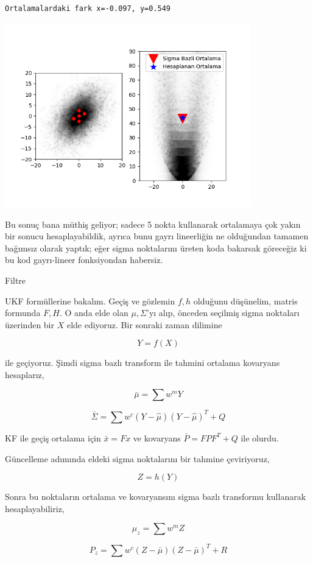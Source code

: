 \documentclass[12pt,fleqn]{article}\usepackage{../../common}
\begin{document}
\begin{verbatim}
Ortalamalardaki fark x=-0.097, y=0.549
\end{verbatim}

\includegraphics[height=8cm]{tser_ukf_12.png}

Bu sonuç bana müthiş geliyor; sadece 5 nokta kullanarak ortalamaya çok
yakın bir sonucu hesaplayabildik, ayrıca bunu gayrı lineerliğin ne
olduğundan tamamen bağımsız olarak yaptık; eğer sigma noktalarını üreten
koda bakarsak göreceğiz ki bu kod gayrı-lineer fonksiyondan habersiz.

Filtre

UKF formüllerine bakalım. Geçiş ve gözlemin $f,h$ olduğunu
düşünelim, matris formunda $F,H$. O anda elde olan $\mu,\Sigma$'yı alıp,
önceden seçilmiş sigma noktaları üzerinden bir $X$ elde ediyoruz. Bir
sonraki zaman dilimine

$$ Y = f(X) $$

ile geçiyoruz. Şimdi sigma bazlı transform ile tahmini ortalama kovaryans
hesaplarız,

$$ \bar{\mu} = \sum w^m Y $$ 

$$ \bar{\Sigma} = \sum w^c (Y-\hat{\mu})(Y-\hat{\mu})^T + Q $$

KF ile geçiş ortalama için $\bar{x} = Fx$ ve kovaryans $\bar{P} = FPF^T + Q$ 
ile olurdu. 

Güncelleme adımında eldeki sigma noktalarını bir tahmine çeviriyoruz,

$$ Z = h(Y) $$

Sonra bu noktaların ortalama ve kovaryansını sigma bazlı transformu
kullanarak hesaplayabiliriz, 

$$ \mu_z = \sum w^m Z $$

$$ P_z = \sum w^c (Z-\bar{\mu}) (Z-\bar{\mu})^T + R$$
\end{document}
